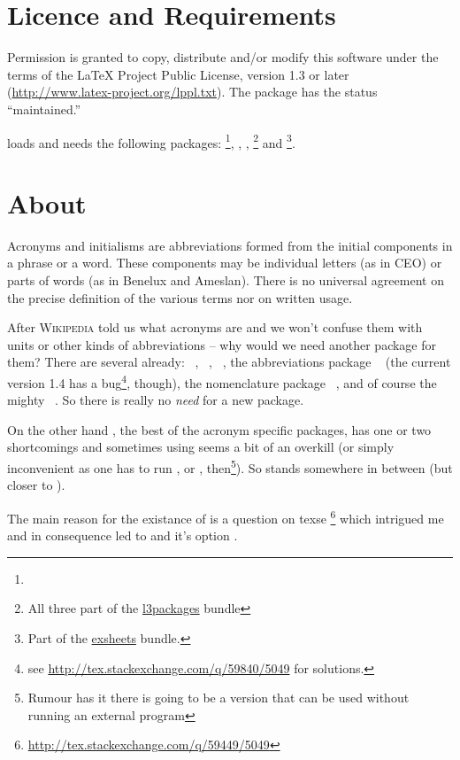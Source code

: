 \documentclass[DIV10,toc=index,toc=bib,hyperfootnotes=false]{cnpkgdoc}
\newcommand*\wikipedia{%
\textsc{Wikipedia}}
\providecommand*\CTANlink[1]{\href{http://www.ctan.org/pkg/#1}{#1}}
\begin{document}
\section{Licence and Requirements}
Permission is granted to copy, distribute and/or modify this software under the
terms of the \LaTeX{} Project Public License, version 1.3 or later
(\url{http://www.latex-project.org/lppl.txt}). The package has the status
``maintained.''

\acro loads and needs the following packages: \footnote{},
, , \footnote{All three part of
the \CTANlink{l3packages} bundle} and \footnote{Part of the
\CTANlink{exsheets} bundle.}.

\section{About}
\begin{zitat}
 Acronyms and initialisms are abbreviations formed from the initial components
 in a phrase or a word. These components may be individual letters (as in CEO)
 or parts of words (as in Benelux and Ameslan). There is no universal agreement
 on the precise definition of the various terms nor on written usage.
\end{zitat}
After \wikipedia{} told us what acronyms are and we won't confuse them with units
or other kinds of abbreviations -- why would we need another package for them?
There are several already: ~\cite{acronym}, %
~\cite{acromake}, ~\cite{acroterm}, the abbreviations package
~\cite{abbrevs} (the current version 1.4 has a bug\footnote{see
\url{http://tex.stackexchange.com/q/59840/5049} for solutions.}, though), the
nomenclature package ~\cite{nomencl}, and of course the mighty
~\cite{glossaries}. So there is really no \emph{need} for a
new package.

On the other hand , the best of the acronym specific packages,
has one or two shortcomings and sometimes using  seems a bit
of an overkill (or simply inconvenient as one has to run ,
 or , then\footnote{Rumour has it there is going to
be a version that can be used without running an external program}). So \acro
stands somewhere in between (but closer to ).

The main reason for the existance of \acro is a question on \acs{texse}%
\footnote{\url{http://tex.stackexchange.com/q/59449/5049}} which intrigued
me and in consequence led to \acro and it's option .
\end{document}

